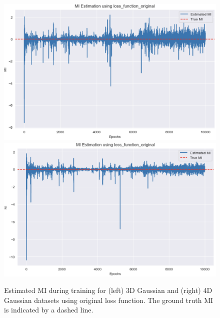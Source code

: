 \documentclass[lettersize,journal]{IEEEtran}
\begin{document}
\begin{figure}[h]
    \centering
    \includegraphics[width=1\linewidth]{figures/3d_mi_estimates.png}
    \includegraphics[width=1\linewidth]{figures/4d_mi_estimates.png}
    \caption{Estimated MI during training for (left) 3D Gaussian and (right) 4D Gaussian datasets using original loss function. The ground truth MI is indicated by a dashed line.}
    \label{fig:mi_estimates}
\end{figure}
\end{document}
